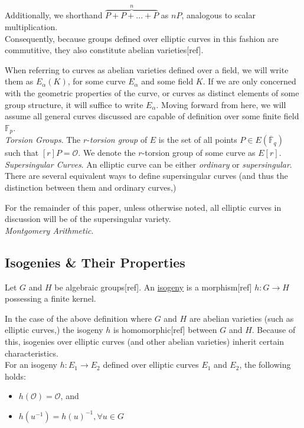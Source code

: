 Additionally, we shorthand $\overbrace{P + P + ... + P}^{n}$ as $nP$, analogous to scalar multiplication.\\

Consequently, because groups defined over elliptic curves in this fashion are commutitive, they also constitute abelian varieties[ref].

When referring to curves as abelian varieties defined over a field, we will write them as $E_{\alpha}(K)$, for some curve $E_{\alpha}$ and some field $K$. If we are only concerned with the geometric properties of the curve, or curves as distinct elements of some group structure, it will suffice to write $E_{\alpha}$. Moving forward from here, we will assume all general curves discussed are capable of definition over some finite field $\mathbb{F}_p$.\\

\noindent
\emph{Torsion Groups}. The $r$-\emph{torsion group} of $E$ is the set of all points $P \in E(\overline{\mathbb{F}}_q)$ such that $[r]P = \mathcal{O}$. We denote the $r$-torsion group of some curve as $E[r]$.\\

\noindent
\emph{Supersingular Curves}. An elliptic curve can be either \emph{ordinary} or \emph{supersingular}. There are several equivalent ways to define supersingular curves (and thus the distinction between them and ordinary curves,)

For the remainder of this paper, unless otherwise noted, all elliptic curves in discussion will be of the supersingular variety.\\

\noindent
\emph{Montgomery Arithmetic}.

\subsection{Isogenies \& Their Properties}

\begin{tcolorbox}
\begin{definition}[Isogeny]
\label{defn:isogeny}
Let $G$ and $H$ be algebraic groups[ref]. An \underline{isogeny} is a morphism[ref] $h: G \rightarrow H$ possessing a finite kernel.
\end{definition}
\end{tcolorbox}

In the case of the above definition where $G$ and $H$ are abelian varieties (such as elliptic curves,) the isogeny $h$ is homomorphic[ref] between $G$ and $H$. Because of this, isogenies over elliptic curves (and other abelian varieties) inherit certain characteristics.\\
For an isogeny $h: E_{1} \rightarrow E_{2}$ defined over elliptic curves $E_1$ and $E_2$, the following holds:
\begin{itemize}
\item $h(\mathcal{O}) = \mathcal{O}$, and
\item $h(u^{-1}) = h(u)^{-1}, \forall u \in G$
\end{itemize}

